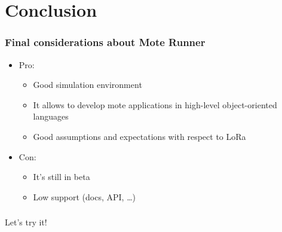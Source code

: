 \section{Conclusion} 

\begin{frame}[fragile]
  \frametitle{Final considerations about Mote Runner}
   \begin{itemize}
    \item Pro:
    \begin{itemize}
      \item Good simulation environment
      \item It allows to develop mote applications in high-level object-oriented languages
      \item Good assumptions and expectations with respect to LoRa
    \end{itemize}
    \item Con:
    \begin{itemize}
      \item It's still in beta
      \item Low support (docs, API, \dots)
    \end{itemize}
  \end{itemize}
\end{frame}

\begin{frame}[fragile]
  \frametitle{}
  Let's try it!
\end{frame}
